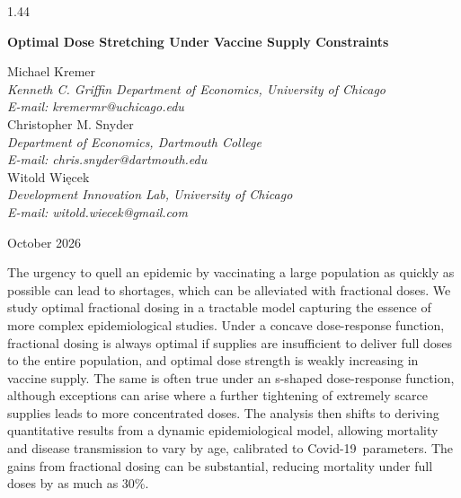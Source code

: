 \documentclass[12pt]{article}
\newcommand{\covid}{Covid-19}
\newcommand{\Wiecek}{Wi\k{e}cek}
\begin{document}
\begin{spacing}{1.44}

\begin{titlepage}
\singlespace

\begin{center}
{\large \bf Optimal Dose Stretching Under Vaccine Supply Constraints}
\end{center}

\vspace{2ex}

{\flushleft
Michael Kremer\\
{\em Kenneth C. Griffin Department of Economics, University of Chicago\\ 
E-mail: kremermr@uchicago.edu}\\[2ex]
Christopher M. Snyder\\
{\em Department of Economics, Dartmouth College\\
E-mail: chris.snyder@dartmouth.edu}\\[2ex]
Witold \Wiecek\\
{\em Development Innovation Lab, University of Chicago\\
E-mail: witold.wiecek@gmail.com}}

\vspace{2ex}

\begin{center}
October 2026
\end{center}

\vspace{2ex}

 The urgency to quell an epidemic by
vaccinating a large population as quickly as possible can lead to
shortages, which can be alleviated with fractional doses. We study
optimal fractional dosing in a tractable model capturing the essence
of more complex epidemiological studies. Under a concave dose-response
function, fractional dosing is always optimal if supplies are
insufficient to deliver full doses to the entire population, and
optimal dose strength is weakly increasing in vaccine supply. The same
is often true under an s-shaped dose-response function, although
exceptions can arise where a further tightening of extremely scarce
supplies leads to more concentrated doses. The analysis then shifts to
deriving quantitative results from a dynamic epidemiological model,
allowing mortality and disease transmission to vary by age, calibrated
to \covid\ parameters. The gains from fractional dosing can be
substantial, reducing mortality under full doses by
as much as 30\%.


\end{titlepage}
\end{spacing}
\end{document}

